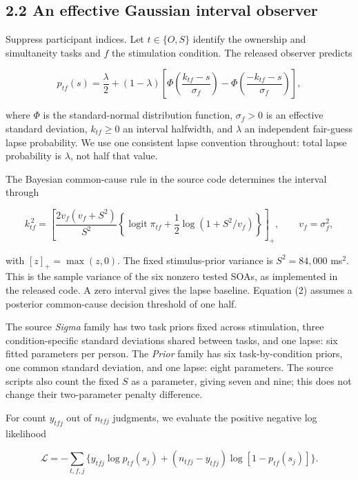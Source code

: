 \documentclass[
  11pt,
]{article}
\let\ctdoldsubsection\subsection
\renewcommand{\subsection}{\Needspace{6\baselineskip}\ctdoldsubsection}
\begin{document}
\hypertarget{an-effective-gaussian-interval-observer}{%
\subsection{2.2 An effective Gaussian interval
observer}\label{an-effective-gaussian-interval-observer}}

Suppress participant indices. Let \(t\in\{O,S\}\) identify the ownership
and simultaneity tasks and \(f\) the stimulation condition. The released
observer predicts

\[
p_{tf}(s)=\frac{\lambda}{2}+(1-\lambda)
\left[
\Phi\!\left(\frac{k_{tf}-s}{\sigma_f}\right)
-\Phi\!\left(\frac{-k_{tf}-s}{\sigma_f}\right)
\right],
\tag{1}
\]

where \(\Phi\) is the standard-normal distribution function,
\(\sigma_f>0\) is an effective standard deviation, \(k_{tf}\geq0\) an
interval halfwidth, and \(\lambda\) an independent fair-guess lapse
probability. We use one consistent lapse convention throughout: total
lapse probability is \(\lambda\), not half that value.

The Bayesian common-cause rule in the source code determines the
interval through

\[
k_{tf}^{\,2}=
\left[
\frac{2v_f(v_f+S^2)}{S^2}
\left\{\operatorname{logit}\pi_{tf}
+\frac12\log(1+S^2/v_f)\right\}
\right]_+,
\qquad v_f=\sigma_f^2 ,
\tag{2}
\]

with \([z]_+=\max(z,0)\). The fixed stimulus-prior variance is
\(S^2=84{,}000\) ms\(^2\). This is the sample variance of the six
nonzero tested SOAs, as implemented in the released code. A zero
interval gives the lapse baseline. Equation (2) assumes a posterior
common-cause decision threshold of one half.

The source \emph{Sigma} family has two task priors fixed across
stimulation, three condition-specific standard deviations shared between
tasks, and one lapse: six fitted parameters per person. The \emph{Prior}
family has six task-by-condition priors, one common standard deviation,
and one lapse: eight parameters. The source scripts also count the fixed
\(S\) as a parameter, giving seven and nine; this does not change their
two-parameter penalty difference.

For count \(y_{tfj}\) out of \(n_{tfj}\) judgments, we evaluate the
positive negative log likelihood

\[
\mathcal L=-\sum_{t,f,j}
\{y_{tfj}\log p_{tf}(s_j)
+(n_{tfj}-y_{tfj})\log[1-p_{tf}(s_j)]\}.
\tag{3}
\]
\end{document}
